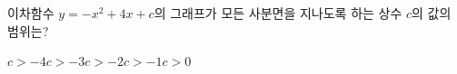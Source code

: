 이차함수 $y=-x^2+4x+c$의 그래프가 모든 사분면을 지나도록 하는 상수 $c$의 값의 범위는?
\begin{choices32}{$c>-4$}{$c>-3$}{$c>-2$}{$c>-1$}{$c>0$}\end{choices32}
